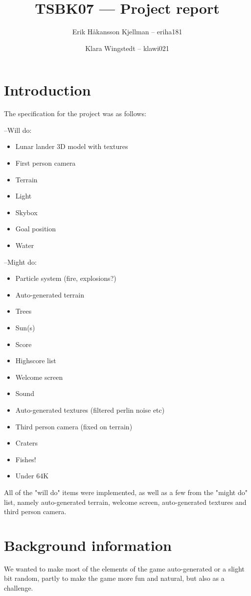 \documentclass[11pt]{article}
\title{TSBK07 --- Project report}
\author{Erik Håkansson Kjellman -- eriha181 \and Klara Wingstedt -- klawi021}
\begin{document}
\maketitle

\section{Introduction}
The specification for the project was as follows: \\

\begin{minipage}[t]{0.5\textwidth}
--Will do:
\begin{itemize}
\item Lunar lander 3D model with textures
\item First person camera
\item Terrain
\item Light
\item Skybox
\item Goal position
\item Water
\end{itemize}
\end{minipage}
\begin{minipage}[t]{0.5\textwidth}
--Might do:
\begin{itemize}
\item Particle system (fire, explosions?)
\item Auto-generated terrain
\item Trees
\item Sun(s)
\item Score
\item Highscore list
\item Welcome screen
\item Sound
\item Auto-generated textures (filtered perlin noise etc)
\item Third person camera (fixed on terrain)
\item Craters
\item Fishes!
\item Under 64K
\end{itemize}
\end{minipage}
\newpage
All of the "will do" items were implemented, as well as a few from the "might do" list, namely auto-generated terrain,
welcome screen, auto-generated textures and third person camera. 

\section{Background information}
We wanted to make most of the elements of the game auto-generated or a slight bit random, partly to make the game more fun and natural, but also as a challenge. 
\end{document}
